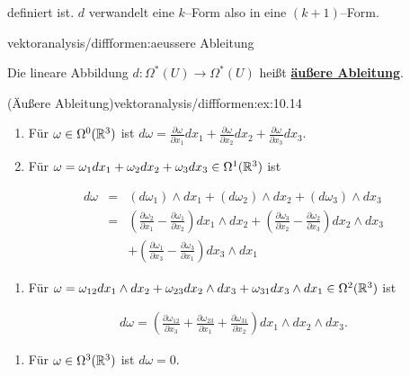 \par
definiert ist. \(d\) verwandelt eine \(k\)–Form also in eine \((k+1)\)–Form.
\begin{definition}{}{vektoranalysis/diffformen:aeussere Ableitung}



\par
Die lineare Abbildung \(d:\Omega^*(U)\to\Omega^*(U)\) heißt \href{https://de.wikipedia.org/wiki/\%C3\%84u\%C3\%9Fere\_Ableitung}{\textbf{äußere Ableitung}}.
\end{definition}
\begin{example}{(Äußere Ableitung)}{vektoranalysis/diffformen:ex:10.14}


\begin{enumerate}

\item {} 
\par
Für \(\omega\in\Omega^0(\mathbb{R}^3)\) ist \(d\omega = \frac{\partial\omega}{\partial x_1}dx_1+
\frac{\partial\omega}{\partial x_2}dx_2+\frac{\partial\omega}{\partial x_3}dx_3\).

\item {} 
\par
Für \(\omega = \omega_1dx_1+\omega_2dx_2+\omega_3dx_3\in\Omega^1(\mathbb{R}^3)\) ist

\end{enumerate}
\begin{align*}
d\omega &=& (d\omega_1)\wedge dx_1+(d\omega_2)\wedge dx_2+(d\omega_3)\wedge
dx_3\\
&=& \left(\frac{\partial\omega_2}{\partial x_1}-\frac{\partial\omega_1}{\partial x_2}\right)
dx_1\wedge dx_2+ \left(\frac{\partial\omega_3}{\partial x_2}-\frac{\partial\omega_2}{\partial x_3}\right)
dx_2\wedge dx_3\\
&& + \left(\frac{\partial\omega_1}{\partial x_3}-\frac{\partial\omega_3}{\partial x_1}\right)
dx_3\wedge dx_1
\end{align*}\begin{enumerate}

\item {} 
\par
Für \(\omega = \omega_{12}dx_1\wedge dx_2+\omega_{23}dx_2\wedge dx_3
+\omega_{31}dx_3\wedge dx_1 \in\Omega^2(\mathbb{R}^3)\) ist

\end{enumerate}
\begin{align*}
d\omega = \left(\frac{\partial\omega_{12}}{\partial x_3} + \frac{\partial\omega_{23}}{\partial x_1}
+ \frac{\partial\omega_{31}}{\partial x_2}\right)dx_1\wedge dx_2\wedge dx_3.
\end{align*}\begin{enumerate}

\item {} 
\par
Für \(\omega\in\Omega^3(\mathbb{R}^3)\) ist \(d\omega=0\).

\end{enumerate}
\end{example}
